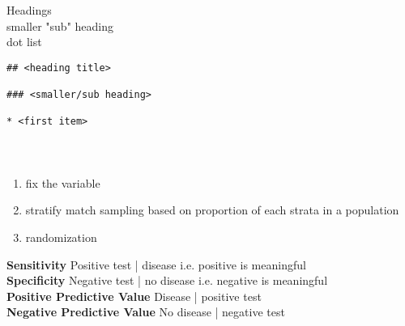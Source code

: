 \documentclass[12pt,a4paper]{report}
\begin{document}
\begin{tcolorbox}[colback=pageyl,colframe=pagebl,title= Markdown Syntax \hfill ,coltitle=Magenta,fonttitle=\bfseries,coltext=Black,width=0.9\paperwidth,boxrule=2mm]\colorbox{pageyl}{\noindent\begin{minipage}[t]{0.3\textwidth}\sffamily \color{ctnb}\vspace{\baselineskip}
Headings\\[\baselineskip]
smaller "sub" heading\\[\baselineskip]
dot list
\end{minipage}}\qquad\begin{minipage}[t]{0.672\textwidth}
{\begin{lstlisting}[frame=single,framerule=0pt, numbers=none, numbersep=10pt, aboveskip=20pt,belowskip=20pt]
## <heading title>

### <smaller/sub heading>

* <first item>
\end{lstlisting}}\end{minipage}\end{tcolorbox}

\newpage
\paragraph{\color{RoyalBlue}{Dealing with confounding}\\}
\begin{enumerate}
\item fix the variable \\
\item stratify match sampling based on proportion of each strata in a population \\
\item randomization 
\end{enumerate}


{\color{Magenta}\bf Sensitivity} Positive test | disease i.e. positive is meaningful\\
{\color{Magenta}\bf Specificity} Negative test | no disease i.e. negative is meaningful \\
{\color{Magenta}\bf Positive Predictive Value} Disease | positive test \\
{\color{Magenta}\bf Negative Predictive Value} No disease | negative test \\[\baselineskip]
\end{document}
